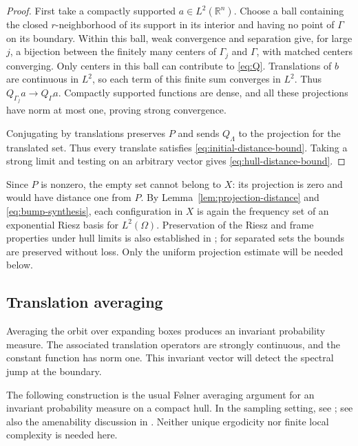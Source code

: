 \documentclass[a4paper,12pt,reqno]{amsart}
\newcommand{\lead}[1]{\par\smallskip\noindent\leavevmode#1\par\smallskip}
\theoremstyle{remark}
\numberwithin{equation}{section}
\newcommand{\R}{\mathbb R}
\begin{document}
\begin{proof}
First take a compactly supported $a\in L^2(\R^n)$. Choose a ball
containing the closed $r$-neighborhood of its support in its interior
and having no point of $\Gamma$ on its boundary. Within this ball,
weak convergence and separation give, for large $j$, a bijection
between the finitely many centers of $\Gamma_j$ and $\Gamma$, with
matched centers converging. Only centers in this ball can contribute
to \eqref{eq:Q}. Translations of $b$ are continuous in $L^2$, so each
term of this finite sum converges in $L^2$. Thus
$Q_{\Gamma_j}a\to Q_\Gamma a$. Compactly supported functions are dense,
and all these projections have norm at most one, proving strong
convergence.

Conjugating by translations preserves $P$ and sends $Q_\Lambda$ to
the projection for the translated set. Thus every translate satisfies
\eqref{eq:initial-distance-bound}. Taking a strong limit and testing
on an arbitrary vector gives \eqref{eq:hull-distance-bound}.
\end{proof}

Since $P$ is nonzero, the empty set cannot belong to $X$: its projection
is zero and would have distance one from $P$. By
Lemma~\ref{lem:projection-distance} and \eqref{eq:bump-synthesis}, each
configuration in $X$ is again the frequency set of an exponential
Riesz basis for $L^2(\Omega)$. Preservation of the Riesz and frame
properties under hull limits is also established in
\cite[Proposition~3.8 and Theorem~3.9]{EnstadRaum}; for separated
sets the bounds are preserved without loss. Only the uniform projection
estimate will be needed below.

\subsection{Translation averaging}

\lead{Averaging the orbit over expanding boxes produces an invariant
probability measure. The associated translation operators are strongly
continuous, and the constant function has norm one. This invariant vector
will detect the spectral jump at the boundary.}

The following construction is the usual F\o lner averaging argument for
an invariant probability measure on a compact hull. In the sampling
setting, see \cite[proof of Theorem~2.16, Steps~2--3]{EnstadRaum};
see also the amenability discussion in
\cite[Section~2.3]{EnstadVanVelthoven}. Neither unique ergodicity nor
finite local complexity is needed here.
\end{document}
